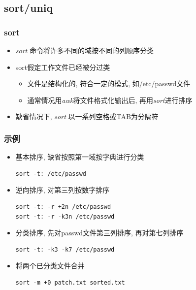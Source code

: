 \documentclass[compress]{beamer}
\begin{document}
\subsection{sort/uniq}

\begin{frame}
\frametitle{sort}
\begin{itemize}
\item \emph{sort} 命令将许多不同的域按不同的列顺序分类
\item sort假定工作文件已经被分过类
    \begin{itemize}
    \item 文件是结构化的, 符合一定的模式, 如/etc/passwd文件
    \item 通常情况用\emph{awk}将文件格式化输出后, 再用\emph{sort}进行排序
    \end{itemize}
\item 缺省情况下, \emph{sort} 以一系列空格或TAB为分隔符

\end{itemize}
\end{frame}

\begin{frame}[fragile]
\frametitle{示例}

\begin{itemize}
\item 基本排序, 缺省按照第一域按字典进行分类 \\
\begin{Verbatim}
sort -t: /etc/passwd
\end{Verbatim}

\item 逆向排序, 对第三列按数字排序 \\
\begin{Verbatim}
sort -t: -r +2n /etc/passwd
sort -t: -r -k3n /etc/passwd
\end{Verbatim}

\item 分类排序, 先对passwd文件第三列排序, 再对第七列排序\\
\begin{Verbatim}
sort -t: -k3 -k7 /etc/passwd
\end{Verbatim}

\item 将两个已分类文件合并\\
\begin{Verbatim}
sort -m +0 patch.txt sorted.txt
\end{Verbatim}

\end{itemize}

\end{frame}
\end{document}
